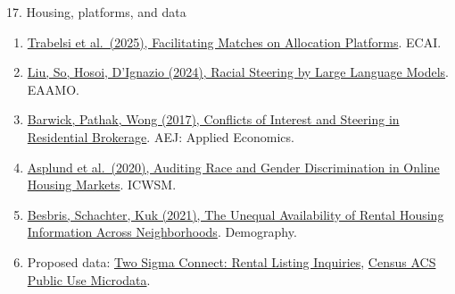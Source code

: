 \begin{frame}[t,label=refs-housing]{17. Housing, platforms, and data}
\fontsize{10.5}{13}\selectfont
\begin{enumerate}
\setlength{\itemsep}{5pt}
\item \href{https://arxiv.org/abs/2508.18325}{Trabelsi et al.\ (2025), Facilitating Matches on Allocation Platforms}. ECAI.
\item \href{https://r-t-lab.org/works/housing-gpt-audit/}{Liu, So, Hosoi, D'Ignazio (2024), Racial Steering by Large Language Models}. EAAMO.
\item \href{https://doi.org/10.1257/app.20160214}{Barwick, Pathak, Wong (2017), Conflicts of Interest and Steering in Residential Brokerage}. AEJ: Applied Economics.
\item \href{https://ojs.aaai.org/index.php/ICWSM/article/view/7276}{Asplund et al.\ (2020), Auditing Race and Gender Discrimination in Online Housing Markets}. ICWSM.
\item \href{https://doi.org/10.1215/00703370-9357518}{Besbris, Schachter, Kuk (2021), The Unequal Availability of Rental Housing Information Across Neighborhoods}. Demography.
\item Proposed data: \href{https://www.kaggle.com/competitions/two-sigma-connect-rental-listing-inquiries/data}{Two Sigma Connect: Rental Listing Inquiries},
\href{https://www.census.gov/programs-surveys/acs/microdata.html}{Census ACS Public Use Microdata}.
\end{enumerate}
\end{frame}
